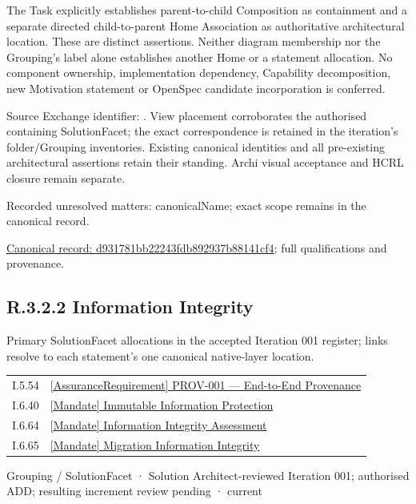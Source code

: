 The Task explicitly establishes parent-to-child Composition as containment and
a separate directed child-to-parent Home Association as authoritative architectural
location. These are distinct assertions. Neither diagram membership nor the
Grouping's label alone establishes another Home or a statement allocation.
No component ownership, implementation dependency, Capability decomposition,
new Motivation statement or OpenSpec candidate incorporation is conferred.



Source Exchange identifier: \texttt{}. View placement corroborates
the authorised containing SolutionFacet; the exact correspondence is retained in the
iteration's folder/Grouping inventories. Existing canonical identities and all
pre-existing architectural assertions retain their standing. Archi visual
acceptance and HCRL closure remain separate.


{\small Recorded unresolved matters: canonicalName; exact scope remains in the canonical record.}\par
{\footnotesize \href{../../../../../../../continuum/grouping/d931781bb22243fdb892937b88141cf4.md}{Canonical record: d931781bb22243fdb892937b88141cf4}; full qualifications and provenance.}\par
\subsection*{R.3.2.2 Information Integrity}
\label{navigation:R.3.2.2}

Primary SolutionFacet allocations in the accepted Iteration 001 register; links resolve to each statement’s one canonical native-layer location.\par
\begin{longtable}{p{.22\linewidth}p{.73\linewidth}}
I.5.54 & \hyperref[element:3e45e60affb44bf384d54de26d3add6a]{[AssuranceRequirement] PROV-001 — End-to-End Provenance} \\
I.6.40 & \hyperref[element:4a25d9c8aaa9418fbddb5bff7302c46d]{[Mandate] Immutable Information Protection} \\
I.6.64 & \hyperref[element:6316761bfd414032a8d889c7ba34131d]{[Mandate] Information Integrity Assessment} \\
I.6.65 & \hyperref[element:22583ccb89dc4cf683c710760bc4b1f2]{[Mandate] Migration Information Integrity} \\
\end{longtable}
\label{element:eb1b0526b898448688a322cce7ea6e74}
{\small Grouping / SolutionFacet · Solution Architect-reviewed Iteration 001; authorised ADD; resulting increment review pending · current}\par

